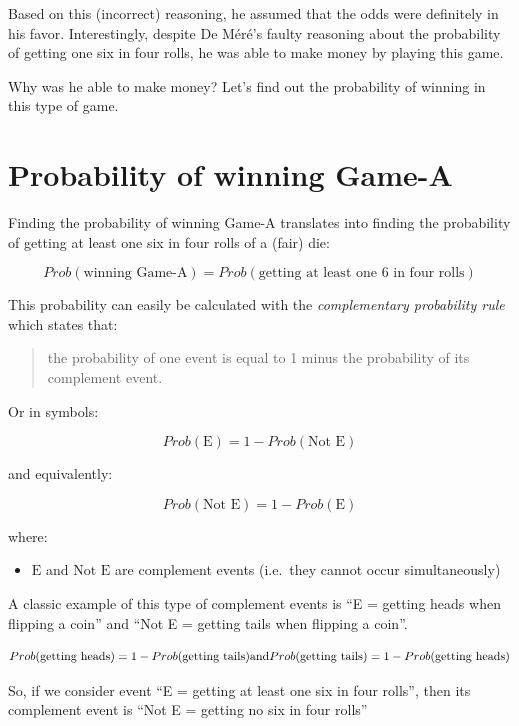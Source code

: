 \documentclass[
]{book}
\providecommand{\tightlist}{%
  \setlength{\itemsep}{0pt}\setlength{\parskip}{0pt}}
\begin{document}
Based on this (incorrect) reasoning, he assumed that the odds were definitely
in his favor. Interestingly, despite De Méré's faulty reasoning about the
probability of getting one six in four rolls, he was able to make money by
playing this game.

Why was he able to make money? Let's find out the probability of winning in
this type of game.

\hypertarget{probability-of-winning-game-a}{%
\section{Probability of winning Game-A}\label{probability-of-winning-game-a}}

Finding the probability of winning Game-A translates into finding the probability
of getting at least one six in four rolls of a (fair) die:

\[
Prob(\text{winning Game-A}) = Prob(\text{getting at least one 6 in four rolls})
\]

This probability can easily be calculated with the
\emph{complementary probability rule} which states that:

\begin{quote}
the probability of one event is equal to 1 minus the probability of
its complement event.
\end{quote}

Or in symbols:

\[
Prob(\text{E}) = 1 - Prob(\text{Not E})
\]

and equivalently:

\[
Prob(\text{Not E}) = 1 - Prob(\text{E})
\]

where:

\begin{itemize}
\tightlist
\item
  \(\text{E}\) and \(\text{Not E}\) are complement events (i.e.~they cannot
  occur simultaneously)
\end{itemize}

A classic example of this type of complement events is ``E = getting heads when
flipping a coin'' and ``Not E = getting tails when flipping a coin''.

\[
Prob(\text{getting heads}) = 1 - Prob(\text{getting tails}) \\
\text{and} \\
Prob(\text{getting tails}) = 1 - Prob(\text{getting heads})
\]

So, if we consider event ``E = getting at least one six in four rolls'', then its
complement event is ``Not E = getting no six in four rolls''
\end{document}
